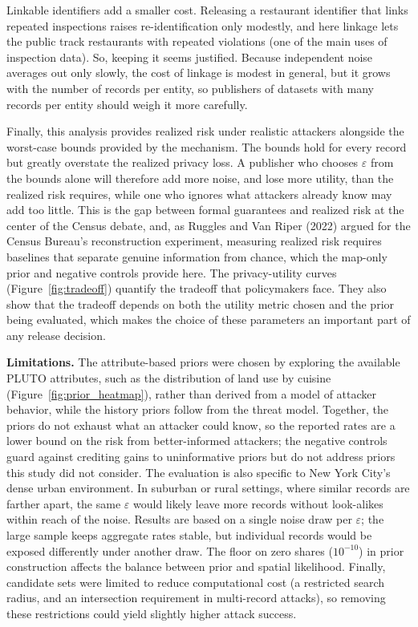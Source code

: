 \documentclass[11pt]{article}
\begin{document}
Linkable identifiers add a smaller cost. Releasing a restaurant identifier that links repeated inspections raises re-identification only modestly, and here linkage lets the public track restaurants with repeated violations (one of the main uses of inspection data). So, keeping it seems justified. Because independent noise averages out only slowly, the cost of linkage is modest in general, but it grows with the number of records per entity, so publishers of datasets with many records per entity should weigh it more carefully.

Finally, this analysis provides realized risk under realistic attackers alongside the worst-case bounds provided by the mechanism. The bounds hold for every record but greatly overstate the realized privacy loss. A publisher who chooses $\varepsilon$ from the bounds alone will therefore add more noise, and lose more utility, than the realized risk requires, while one who ignores what attackers already know may add too little. This is the gap between formal guarantees and realized risk at the center of the Census debate, and, as Ruggles and Van Riper (2022) argued for the Census Bureau's reconstruction experiment, measuring realized risk requires baselines that separate genuine information from chance, which the map-only prior and negative controls provide here. The privacy-utility curves (Figure~\ref{fig:tradeoff}) quantify the tradeoff that policymakers face. They also show that the tradeoff depends on both the utility metric chosen and the prior being evaluated, which makes the choice of these parameters an important part of any release decision.

\textbf{Limitations.} The attribute-based priors were chosen by exploring the available PLUTO attributes, such as the distribution of land use by cuisine (Figure~\ref{fig:prior_heatmap}), rather than derived from a model of attacker behavior, while the history priors follow from the threat model. Together, the priors do not exhaust what an attacker could know, so the reported rates are a lower bound on the risk from better-informed attackers; the negative controls guard against crediting gains to uninformative priors but do not address priors this study did not consider. The evaluation is also specific to New York City's dense urban environment. In suburban or rural settings, where similar records are farther apart, the same $\varepsilon$ would likely leave more records without look-alikes within reach of the noise. Results are based on a single noise draw per $\varepsilon$; the large sample keeps aggregate rates stable, but individual records would be exposed differently under another draw. The floor on zero shares ($10^{-10}$) in prior construction affects the balance between prior and spatial likelihood. Finally, candidate sets were limited to reduce computational cost (a restricted search radius, and an intersection requirement in multi-record attacks), so removing these restrictions could yield slightly higher attack success.
\end{document}
